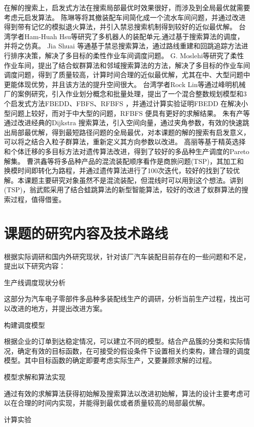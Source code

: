 在解的搜索上，启发式方法在搜索局部最优时效果很好，而涉及到全局最优就需要考虑元启发算法。
陈琳\cite{陈琳2009}等将其撤装配车间简化成一个流水车间问题，并通过改进得到带有记忆的模拟退火算法，并引入禁忌搜索机制得到较好的近似最优解。
台湾学者Ham-Huah Hsu\cite{hsu1995fully}等研究了多机器人的装配单元,通过基于搜索算法的调度，并将之仿真。
Jia Shuai\cite{jia2014path} 等通基于禁忌搜索算法，通过路线重建和回跳追踪方法进行排序决策，解决了多目标的柔性作业车间调度问题。
G. Moslehi\cite{moslehi2011pareto}等研究了柔性作业车间，提出了结合蚁群算法和邻域搜索算法的方法，解决了多目标的作业车间调度问题，得到了质量较高，计算时间合理的近似最优解，尤其在中、大型问题中更能体现优势，并且该方法的提升空间很大。
台湾学者Rock Lin\cite{lin2012case}等通过峰明机械厂的案例研究，引入作业划分概念和批量处理，提出了一个混合整数规划模型和3个启发式方法FBEDD、FBFS、RFBFS ，并通过计算实验证明FBEDD 在解决小型问题上较好，而对于中大型的问题，RFBFS 便具有更好的求解结果。
朱有产\cite{朱有产2006}等通过改进经典的Dijkstra 搜索算法，引入空间向量，通过夹角参数，有效的快速跳出局部最优解，得到最短路径问题的全局最优，对本课题的解的搜索有启发意义，可以将之结合入粒子群算法，重新定义其方向参数以改进。
高丽\cite{高丽2012}等基于精英选择和个体迁移的多目标方法对遗传算法改进，得到了较好的多品种生产调度的Pareto 解集。
曹洪鑫\cite{曾洪鑫2006}等将多品种产品的混流装配顺序看作是商旅问题(TSP)，其加工和换模时间即转化为路程，并通过遗传算法进行了100次迭代，较好的找到了较优解。本课题主要研究对象虽然不是混流装配，但混线时可以用到这个想法。讲到(TSP)，翁武熙\cite{翁武熙2012混合蚁群算法求解}采用了结合蛙跳算法的新型智能算法，较好的改进了蚁群算法的搜索过程，值得借鉴。


\section{课题的研究内容及技术路线}
根据实际调研和国内外研究现状，针对该厂汽车装配目前存在的一些问题和不足，提出以下研究内容：
\renewcommand{\labelenumi}{(\theenumi)}
\begin{asparaenum}
\item 生产线调度现状分析

这部分为汽车电子零部件多品种多装配线生产的调研，分析当前生产过程，找出可以改进的地方，并提出改进方案。
\item 构建调度模型

根据企业的订单到达稳定情况，可以建立不同的模型。结合产品簇的分类和实际情况，确定有效的目标函数，在可接受的假设条件下设置相关约束构，建合理的调度模型。其中目标函数的确定即要考虑实际生产，又要兼顾求解的过程。
\item 模型求解和算法实现

通过有效的求解算法获得初始解及搜索算法以改进初始解，算法的设计主要考虑可以在合理的时间内实现，并能得到最优或者质量较高的局部最优解。
\item 计算实验
\end{asparaenum}

